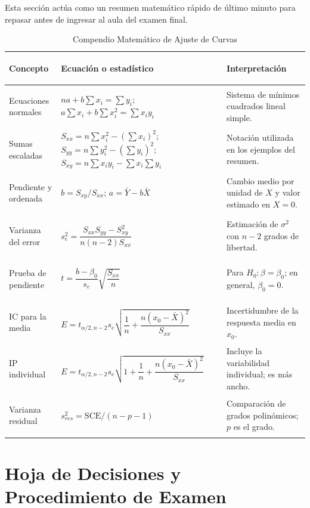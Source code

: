 \documentclass[11pt,a4paper]{article}
\begin{document}
Esta sección actúa como un resumen matemático rápido de último minuto para repasar antes de ingresar al aula del examen final.

\begin{table}[h!]
    \centering
    \caption{Compendio Matemático de Ajuste de Curvas}
    \footnotesize
    \begin{tabularx}{\linewidth}{>{\bfseries\raggedright\arraybackslash}p{3.5cm}>{\raggedright\arraybackslash}X>{\raggedright\arraybackslash}p{4.2cm}}
        \toprule
        Concepto & Ecuación o estadístico & Interpretación \\
        \midrule
        Ecuaciones normales & $na+b\sum x_i=\sum y_i$; $a\sum x_i+b\sum x_i^2=\sum x_iy_i$ & Sistema de mínimos cuadrados lineal simple. \\
        Sumas escaladas & $S_{xx}=n\sum x_i^2-(\sum x_i)^2$; $S_{yy}=n\sum y_i^2-(\sum y_i)^2$; $S_{xy}=n\sum x_iy_i-\sum x_i\sum y_i$ & Notación utilizada en los ejemplos del resumen. \\
        Pendiente y ordenada & $b=S_{xy}/S_{xx}$; $a=\bar Y-b\bar X$ & Cambio medio por unidad de $X$ y valor estimado en $X=0$. \\
        Varianza del error & $s_e^2=\dfrac{S_{xx}S_{yy}-S_{xy}^2}{n(n-2)S_{xx}}$ & Estimación de $\sigma^2$ con $n-2$ grados de libertad. \\
        Prueba de pendiente & $t=\dfrac{b-\beta_0}{s_e}\sqrt{\dfrac{S_{xx}}{n}}$ & Para $H_0:\beta=\beta_0$; en general, $\beta_0=0$. \\
        IC para la media & $E=t_{\alpha/2,n-2}s_e\sqrt{\dfrac1n+\dfrac{n(x_0-\bar X)^2}{S_{xx}}}$ & Incertidumbre de la respuesta media en $x_0$. \\
        IP individual & $E=t_{\alpha/2,n-2}s_e\sqrt{1+\dfrac1n+\dfrac{n(x_0-\bar X)^2}{S_{xx}}}$ & Incluye la variabilidad individual; es más ancho. \\
        Varianza residual & $s^2_{res}=\mathrm{SCE}/(n-p-1)$ & Comparación de grados polinómicos; $p$ es el grado. \\
        \bottomrule
    \end{tabularx}
\end{table}

\section{Hoja de Decisiones y Procedimiento de Examen}
\end{document}
